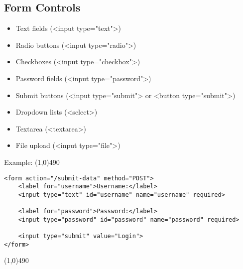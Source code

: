\documentclass{report}
\begin{document}
    \subsection{Form Controls}
    \bigbreak \noindent 
    \begin{itemize}
        \item Text fields (<input type="text">)
        \item Radio buttons (<input type="radio">)
        \item Checkboxes (<input type="checkbox">)
        \item Password fields (<input type="password">)
        \item Submit buttons (<input type="submit"> or <button type="submit">)
        \item Dropdown lists (<select>)
        \item Textarea (<textarea>)
        \item File upload (<input type="file">)
    \end{itemize}

    \pagebreak \bigbreak \noindent 
    Example:
    \bigbreak \noindent 
    \line(1,0){490}
    \begin{verbatim}
<form action="/submit-data" method="POST">
    <label for="username">Username:</label>
    <input type="text" id="username" name="username" required>
    
    <label for="password">Password:</label>
    <input type="password" id="password" name="password" required>
    
    <input type="submit" value="Login">
</form>
    \end{verbatim}
    \line(1,0){490}














    
\end{document}
